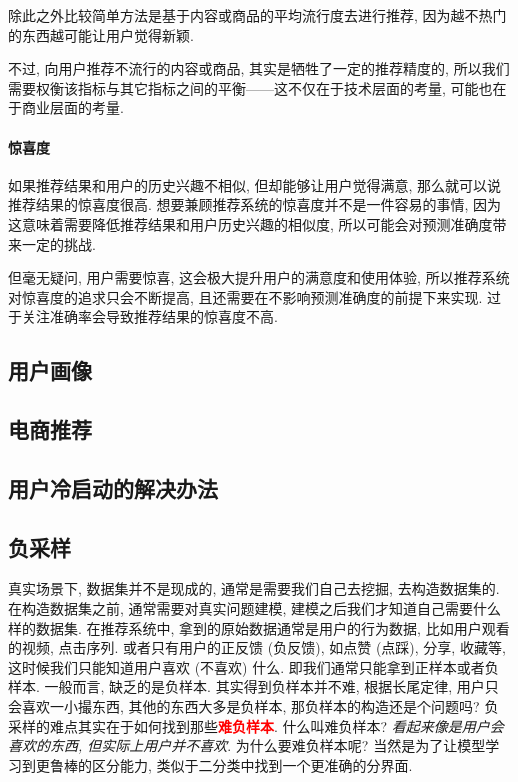 除此之外比较简单方法是基于内容或商品的平均流行度去进行推荐, 因为越不热门的东西越可能让用户觉得新颖. 

不过, 向用户推荐不流行的内容或商品, 其实是牺牲了一定的推荐精度的, 所以我们需要权衡该指标与其它指标之间的平衡——这不仅在于技术层面的考量, 可能也在于商业层面的考量. 

\paragraph{惊喜度}如果推荐结果和用户的历史兴趣不相似, 但却能够让用户觉得满意, 那么就可以说推荐结果的惊喜度很高. 想要兼顾推荐系统的惊喜度并不是一件容易的事情, 因为这意味着需要降低推荐结果和用户历史兴趣的相似度, 所以可能会对预测准确度带来一定的挑战. 

但毫无疑问, 用户需要惊喜, 这会极大提升用户的满意度和使用体验, 所以推荐系统对惊喜度的追求只会不断提高, 且还需要在不影响预测准确度的前提下来实现. 过于关注准确率会导致推荐结果的惊喜度不高. 


\subsection{用户画像}

\subsection{电商推荐}

\subsection{用户冷启动的解决办法}

\subsection{负采样}
真实场景下, 数据集并不是现成的, 通常是需要我们自己去挖掘, 去构造数据集的. 在构造数据集之前, 通常需要对真实问题建模, 建模之后我们才知道自己需要什么样的数据集. 在推荐系统中, 拿到的原始数据通常是用户的行为数据, 比如用户观看的视频, 点击序列. 或者只有用户的正反馈 (负反馈), 如点赞 (点踩), 分享, 收藏等, 这时候我们只能知道用户喜欢 (不喜欢) 什么. 即我们通常只能拿到正样本或者负样本. 一般而言, 缺乏的是负样本. 其实得到负样本并不难, 根据长尾定律, 用户只会喜欢一小撮东西, 其他的东西大多是负样本, 那负样本的构造还是个问题吗? 负采样的难点其实在于如何找到那些\textcolor{red}{\textbf{难负样本}}. 什么叫难负样本? \textit{看起来像是用户会喜欢的东西, 但实际上用户并不喜欢}. 为什么要难负样本呢? 当然是为了让模型学习到更鲁棒的区分能力, 类似于二分类中找到一个更准确的分界面.

